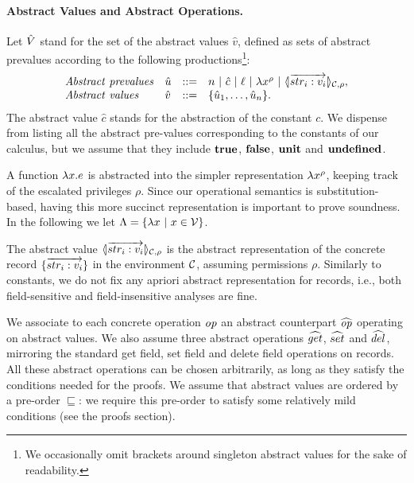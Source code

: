 \paragraph*{Abstract Values and Abstract Operations.} 
Let $\hat{V}$ stand for the set of the abstract values $\hat{v}$,
defined as sets of abstract prevalues according to the following 
productions\footnote{We occasionally omit brackets around singleton 
abstract values for the sake of readability.}:
\[
\begin{array}{llcl}
\mathit{Abstract\ prevalues} & \hat{u} & ::= & n ~|~ \hat{c} ~|~ \ell ~|~ \lambda x^{\rho} ~|~ \langle\!| \overrightarrow{str_i: v_i} |\!\rangle_{{\cal C},\rho}, \\
\mathit{Abstract\ values} & \hat{v} & ::= & \{\hat{u}_1,\ldots,\hat{u}_n\}.
\end{array}
\]
The abstract value $\hat{c}$ stands for the abstraction of the constant $c$.
We dispense from listing all the abstract pre-values corresponding to 
the constants of our calculus, but we assume that they include $\mathbf{true}$, 
$\mathbf{false}$, $\mathbf{unit}$ and $\mathbf{undefined}$.

A function $\lambda x.e$ is abstracted into the simpler representation
$\lambda x^{\rho}$, keeping track of the escalated privileges $\rho$. Since 
our operational semantics is substitution-based, having this more succinct
representation is important to prove soundness. In the following we let 
$\Lambda = \{\lambda x ~|~ x \in \mathcal{V}\}$.

The abstract value $\langle\!| \overrightarrow{str_i: v_i} |\!\rangle_{{\cal C},\rho}$ is the abstract representation
of the concrete record $\{\overrightarrow{str_i: v_i}\}$ in the environment ${\cal C}$, assuming
permissions $\rho$. Similarly to constants, we do not fix any apriori abstract representation
for records, i.e., both field-sensitive and field-insensitive analyses are fine.

We associate to each concrete operation $\mathit{op}$ an abstract counterpart $\widehat{\mathit{op}}$
operating on abstract values. We also assume three abstract operations $\widehat{get}$,
$\widehat{set}$ and $\widehat{del}$, mirroring the standard get field, set field and delete
field operations on records. All these abstract operations can be chosen arbitrarily,
as long as they satisfy the conditions needed for the proofs. We assume that abstract
values are ordered by a pre-order $\sqsubseteq$: we require this pre-order to satisfy
some relatively mild conditions (see the proofs section).

